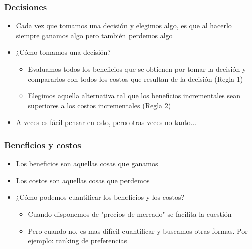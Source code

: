 \documentclass{beamer}
\begin{document}
\begin{frame}
\frametitle{ Decisiones}
\begin{itemize}
    \item Cada vez que tomamos una decisión y elegimos algo, es que al hacerlo siempre ganamos algo pero también perdemos algo \vspace{2mm}
    \item ¿Cómo tomamos una decisión? 
    \begin{itemize}
        \item Evaluamos todos los beneficios que se obtienen por tomar la decisión y compararlos con todos los costos que resultan de la decisión (Regla 1)
        \item Elegimos aquella alternativa tal que los beneficios incrementales sean superiores a los costos incrementales (Regla 2)
        \vspace{1mm}
    \end{itemize}
    \item A veces es fácil pensar en esto, pero otras veces no tanto...
\end{itemize} 
\end{frame}

\begin{frame}
\frametitle{Beneficios y costos}
\begin{itemize}
    \item Los beneficios son aquellas cosas que ganamos \vspace{2mm}
    \item Los costos son aquellas cosas que perdemos \vspace{2mm}
    \item ¿Cómo podemos cuantificar los beneficios y los costos? 
    \begin{itemize}
    \item Cuando disponemos de "precios de mercado" se facilita la cuestión
    \item Pero cuando no, es mas difícil cuantificar y buscamos otras formas. Por ejemplo: ranking de preferencias
    \end{itemize}
\end{itemize} 
\end{frame}
\end{document}
